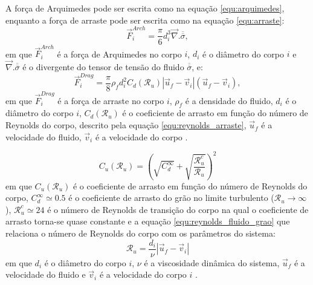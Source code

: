     A força de Arquimedes pode ser escrita como na equação \ref{equ:arquimedes}, enquanto a força de arraste pode ser escrita como na equação \ref{equ:arraste}:
\begin{equation}
    \label{equ:arquimedes}
    \vec{F}_{i}^{Arch} = \frac{\pi}{6} d_{i}^{3} \vec{\nabla}.\overline{\overline{\sigma}},
\end{equation}
em que $\vec{F}_{i}^{Arch}$ é a força de Arquimedes no corpo $i$, $d_{i}$ é o diâmetro do corpo $i$ e $\vec{\nabla}.\overline{\overline{\sigma}}$ é o divergente do tensor de tensão do fluido $\overline{\overline{\sigma}}$, e:
\begin{equation}
    \label{equ:arraste}
    \vec{F}_{i}^{Drag} = \frac{\pi}{8}\rho_{f}d_{i}^{2}C_{d}(\mathcal{R}_{u})\left|\vec{u}_{f}-\vec{v}_{i}\right|(\vec{u}_{f}-\vec{v}_{i}),
\end{equation}
em que $\vec{F}_{i}^{Drag}$ é a força de arraste no corpo $i$, $\rho_{f}$ é a densidade do fluido, $d_{i}$ é o diâmetro do corpo $i$, $C_{d}(\mathcal{R}_{u})$ é o coeficiente de arrasto em função do número de Reynolds do corpo, descrito pela equação \ref{equ:reynolds_arraste}, $\vec{u}_{f}$ é a velocidade do fluido, $\vec{v}_{i}$ é a velocidade do corpo \cite{Numerical_simulation_of_turbulent_sediment_transport}.

\begin{equation}
    \label{equ:reynolds_arraste}
    C_{u}(\mathcal{R}_{u}) = \left( \sqrt{C_{d}^{\infty}} +\sqrt{\frac{\mathcal{R}_{u}^{c}}{\mathcal{R}_{u}}} \right)^{2}
\end{equation}
em que $C_{u}(\mathcal{R}_{u})$ é o coeficiente de arrasto em função do número de Reynolds do corpo, $C_{d}^{\infty} \simeq 0.5$ é o coeficiente de arrasto do grão no limite turbulento ($\mathcal{R}_{u} \to \infty$), $\mathcal{R}_{u}^{c} \simeq 24$ é o número de Reynolds de transição do corpo na qual o coeficiente de arrasto torna-se quase constante e a equação \ref{equ:reynolds_fluido_grao} que relaciona o número de Reynolds do corpo com os parâmetros do sistema:
\begin{equation}
    \label{equ:reynolds_fluido_grao}
    \mathcal{R}_{u} = \frac{d_{i}}{\nu} \left| \vec{u}_{f} -\vec{v}_{i} \right|
\end{equation}
em que $d_{i}$ é o diâmetro do corpo $i$, $\nu$ é a viscosidade dinâmica do sistema, $\vec{u}_{f}$ é a velocidade do fluido e $\vec{v}_{i}$ é a velocidade do corpo $i$ \cite{Numerical_simulation_of_turbulent_sediment_transport}.

